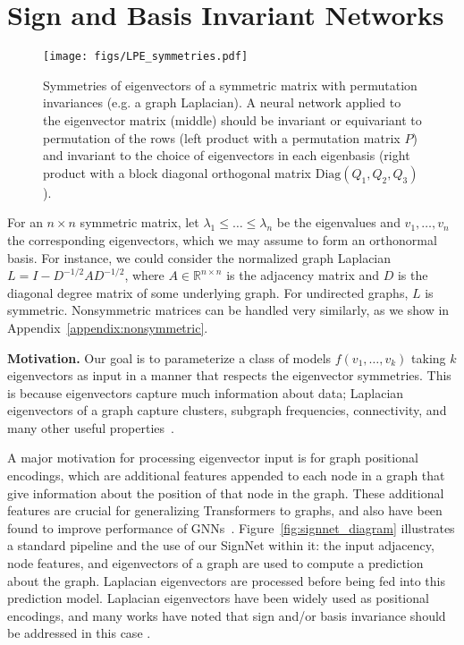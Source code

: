 \documentclass{article} \usepackage{iclr2023_conference,times}
\newcommand{\RR}{\mathbb R}
\newcommand{\mrm}[1]{\mathrm{#1}}
\begin{document}
\section{Sign and Basis Invariant Networks}
\begin{wrapfigure}{r}{0.5\textwidth}
\vspace{-10pt}
\centering
    \texttt{[image: figs/LPE\_symmetries.pdf]}
\caption{Symmetries of eigenvectors of a symmetric matrix with permutation invariances (e.g. a graph Laplacian). A neural network applied to the eigenvector matrix (middle) should be invariant or equivariant to permutation of the rows (left product with a permutation matrix $P$) and invariant to the choice of eigenvectors in each eigenbasis (right product with a block diagonal orthogonal matrix $\mrm{Diag}(Q_1, Q_2, Q_3)$).}
\label{fig:symmetries}
\vspace{-15pt}
\end{wrapfigure}

For an $n \times n$ symmetric matrix, let $\lambda_1 \leq \ldots \leq \lambda_n$ be the eigenvalues and $v_1, \ldots, v_n$ the corresponding eigenvectors, which we may assume to form an orthonormal basis. For instance, we could consider the normalized graph Laplacian $L = I - D^{-1/2} A D^{-1/2}$, where $A \in \RR^{n \times n}$ is the adjacency matrix and $D$ is the diagonal degree matrix  of some underlying graph. For undirected graphs, $L$ is symmetric. Nonsymmetric matrices can be handled very similarly, as we show in Appendix~\ref{appendix:nonsymmetric}.

\textbf{Motivation.} Our goal is to parameterize a class of models $f(v_1, \ldots, v_k)$  taking $k$ eigenvectors as input in a manner that respects the eigenvector symmetries. 
This is because eigenvectors capture much information about data; Laplacian eigenvectors of a graph capture clusters, subgraph frequencies, connectivity, and many other useful properties~\citep{von2007tutorial, cvetkovic1997eigenspaces}.

A major motivation for processing eigenvector input is for graph positional encodings, which are additional features appended to each node in a graph that give information about the position of that node in the graph. These additional features are crucial for generalizing Transformers to graphs, and also have been found to improve performance of GNNs~\citep{dwivedi2020benchmarking, dwivedi2022graph}. Figure~\ref{fig:signnet_diagram} illustrates a standard pipeline and the use of our SignNet within it: the input adjacency, node features, and eigenvectors of a graph are used to compute a prediction about the graph. Laplacian eigenvectors are processed before being fed into this prediction model. Laplacian eigenvectors have been widely used as positional encodings, and many works have noted that sign and/or basis invariance should be addressed in this case \citep{dwivedi2020generalization, beaini2021directional, dwivedi2020benchmarking, kreuzer2021rethinking, mialon2021graphit, dwivedi2022graph, kim2022pure}.
\end{document}
